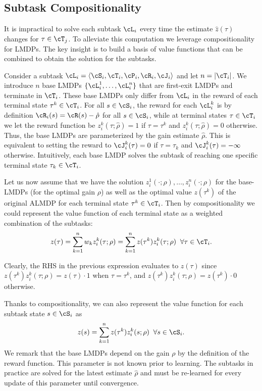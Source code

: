 \subsection{Subtask Compositionality}
It is impractical to solve each subtask $\cL_i$ every time the estimate $\hat z(\tau)$ changes for $\tau\in\cT_j$. To alleviate this computation we leverage compositionality for LMDPs. The key insight is to build a basis of value functions that can be combined to obtain the solution for the subtasks.

Consider a subtask $\cL_i=\langle\cS_i,\cT_i,\cP_i,\cR_i,\cJ_i\rangle$ and let $n=|\cT_i|$.  We introduce $n$ base LMDPs $\{\cL_i^1,\ldots,\cL_i^n\}$ that are first-exit LMDPs and terminate in $\cT_i$. These base LMDPs only differ from $\cL_i$ in the reward of each terminal state $\tau^k\in\cT_i$. For all $s\in\cS_i$, the reward for each $\cL_i^k$ is by definition $\cR_i(s)=\cR(s)-\hat\rho$ for all $s\in\cS_i$, while at terminal states $\tau\in\cT_i$ we let the reward function be $z_i^k(\tau;\hat\rho)=1$ if $\tau=\tau^k$ and $z_i^k(\tau;\hat\rho)=0$ otherwise. Thus, the base LMDPs are parameterized by the gain estimate $\hat\rho$. This is equivalent to setting the reward to $\cJ_i^k(\tau)=0$ if $\tau=\tau_k$ and $\cJ_i^k(\tau)=-\infty$ otherwise. Intuitively, each base LMDP solves the subtask of reaching one specific terminal state $\tau_k\in\cT_i$.

Let us now assume that we have the solution $z_i^1(\cdot;\rho),\ldots,z_i^n(\cdot;\rho)$ for the base-LMDPs (for the optimal gain $\rho$) as well as the optimal value $z(\tau^k)$ of the original ALMDP for each terminal state $\tau^k\in\cT_i$. Then by compositionality we could represent the value function of each terminal state as a weighted combination of the subtasks:
\begin{equation}
  z(\tau) = \sum_{k=1}^n w_k z_i^k(\tau;\rho) =  \sum_{k=1}^n z(\tau^k) z_i^k(\tau;\rho) \;\;\forall\tau\in\cT_i.
  \label{eq:comp_terminal}
\end{equation}

Clearly, the RHS in the previous expression evaluates to $z(\tau)$ since $z(\tau^k) z_i^k(\tau;\rho) = z(\tau)\cdot 1$ when $\tau = \tau^k$, and
$z(\tau^k) z_i^k(\tau;\rho) = z(\tau^k)\cdot 0$ otherwise.

Thanks to compositionality, we can also represent the value function for each subtask state $s\in\cS_i$ as
\begin{equation}
  z(s) = \sum_{k=1}^n z(\tau^k) z_i^k(s;\rho)\;\;\forall s\in\cS_i.
  \label{eq:comp_internal}
\end{equation}
We remark that the base LMDPs depend on the gain $\rho$ by the definition of the reward function. This parameter is not known prior to learning. The subtasks in practice are solved for the latest estimate $\hat\rho$ and must be re-learned for every update of this parameter until convergence.
